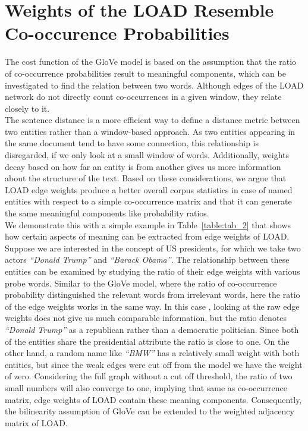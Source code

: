 \section{Weights of the LOAD Resemble Co-occurence Probabilities}
The cost function of the GloVe model is based on the assumption that the ratio of co-occurrence probabilities result to meaningful components, which can be investigated to find the relation between two words. Although edges of the LOAD network do not directly count co-occurrences in a given window, they relate closely to it. \\
The sentence distance is a more efficient way to define a distance metric between two entities rather than a window-based approach. As two entities appearing in the same document tend to have some connection, this relationship is disregarded, if we only look at a small window of words. Additionally, weights decay based on how far an entity is from another gives us more information about the structure of the text. Based on these considerations, we argue that LOAD edge weights produce a better overall corpus statistics in case of named entities with respect to a simple co-occurrence matrix and that it can generate the same meaningful components like probability ratios. \\
We demonstrate this with a simple example in Table~\ref{table:tab_2} that shows
how certain aspects of meaning can be extracted from edge weights of LOAD.  Suppose we are interested in the concept of US presidents, for which we take two actors \emph{``Donald Trump''} and \emph{``Barack Obama''}. The relationship between these entities can be examined by studying the ratio of their edge weights with various probe words. Similar to the GloVe model, where the ratio of co-occurrence probability distinguished the relevant words from irrelevant words, here the ratio of the edge weights works in the same way. In this case , looking at the raw edge weights does not give us much comparable information, but the ratio denotes \emph{``Donald Trump''} as a republican rather than a democratic politician. Since both of the entities share the presidential attribute the ratio is close to one. On the other hand, a random name like \emph{``BMW''} has a relatively small weight with both entities, but since the weak edges were cut off from the model we have the weight of zero. Considering the full graph without a cut off threshold, the ratio of two small numbers will also converge to one, implying that same as co-occurrence matrix, edge weights of LOAD contain these meaning components. Consequently, the bilinearity assumption of GloVe can be extended to the weighted adjacency matrix of LOAD. 

